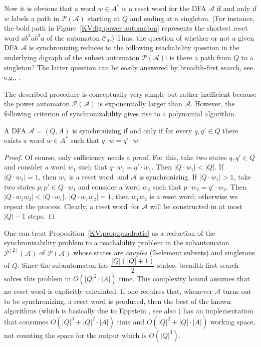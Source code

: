 \documentclass{irmaart}
\newcommand{\sw}{reset word}
\theoremstyle{plain}
\begin{document}
Now it is obvious that a word $w\in A^*$ is a reset word for the
DFA $\mathcal{A}$ if and only if $w$ labels a path in
$\mathcal{P}(\mathcal{A})$ starting at $Q$ and ending at a
singleton. (For instance, the bold path in
Figure~\ref{KV:fig:power automaton} represents the shortest reset
word $ab^3ab^3a$ of the automaton $\mathcal{C}_4$.) Thus, the
question of whether or not a given DFA $\mathcal{A}$ is
synchronizing reduces to the following reachability question in
the underlying digraph of the subset automaton
$\mathcal{P}(\mathcal{A})$: is there a path from $Q$ to a
singleton? The latter question can be easily answered by
breadth-first search,  see, e.g.,
\cite[Section~22.2]{Cormen&Leiserson&Rivest&Stein:2001}.

The described procedure is conceptually very simple but rather inefficient
because the power automaton $\mathcal{P}(\mathcal{A})$ is exponentially larger
than $\mathcal{A}$. However, the following criterion of synchronizability gives
rise to a polynomial algorithm.
\begin{proposition}
\label{KV:prop:quadratic} A DFA $\mathcal{A}=(Q,A)$ is synchronizing if and
only if for every $q,q'\in Q$ there exists a word $w\in A^*$ such that $q\cdot
w=q'\cdot w$.
\end{proposition}

\begin{proof}
Of course, only sufficiency needs a proof. For this, take two states $q,q'\in
Q$ and consider a word $w_1$ such that $q\cdot w_1=q'\cdot w_1$. Then $|Q\cdot
w_1|<|Q|$. If $|Q\cdot w_1|=1$, then $w_1$ is a \sw\ and $\mathcal{A}$ is
synchronizing. If $|Q\cdot w_1|>1$, take two states $p,p'\in Q\cdot w_1$ and
consider a word $w_2$ such that $p\cdot w_2=q'\cdot w_2$. Then $|Q\cdot
w_1w_2|<|Q\cdot w_1|$. $|Q\cdot w_1w_2|=1$, then $w_1w_2$ is a \sw; otherwise
we repeat the process. Clearly, a \sw\ for $\mathcal{A}$ will be constructed in
at most $|Q|-1$ steps.
\end{proof}

One can treat Proposition~\ref{KV:prop:quadratic} as a reduction of the
synchronizability problem to a reachability problem in the subautomaton
$\mathcal{P}^{[2]}(\mathcal{A})$ of $\mathcal{P}(\mathcal{A})$ whose states are
\emph{couples} (2-element subsets) and singletons of $Q$. Since
the subautomaton has $\dfrac{|Q|(|Q|+1)}2$ states, breadth-first search solves
this problem in $O(|Q|^2\cdot|A|)$ time. This complexity bound assumes that no
reset word is explicitly calculated. If one requires that, whenever
$\mathcal{A}$ turns out to be synchronizing, a reset word is produced, then the
best of the known algorithms (which is basically due to Eppstein
\cite[Theorem~6]{Eppstein:1990}, see also \cite[Theorem~1.15]{Sandberg:2005})
has an implementation that consumes $O(|Q|^3 + |Q|^2\cdot|A|)$ time and
$O(|Q|^2 + |Q|\cdot|A|)$ working space, not counting the space for the output
which is $O(|Q|^3)$.
\end{document}
